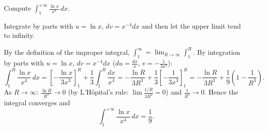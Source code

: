 
\begin{question}
Compute $\displaystyle\int_1^{+\infty}\frac{\ln x}{x^4}\,dx$.
\end{question}

\begin{hint}
Integrate by parts with $u=\ln x$, $dv=x^{-4}dx$ and then let the upper limit tend to infinity.
\end{hint}

\begin{solution}
By the definition of the improper integral, $\int_1^\infty=\lim_{R\to\infty}\int_1^R$. By integration by parts with $u=\ln x$, $dv=x^{-4}dx$ ($du=\frac{dx}{x}$, $v=-\frac{1}{3x^3}$):
\[ \int_1^R\frac{\ln x}{x^4}\,dx=\left[-\frac{\ln x}{3x^3}\right]_1^R+\frac13\int_1^R\frac{dx}{x^4}=-\frac{\ln R}{3R^3}+\frac13\left[-\frac{1}{3x^3}\right]_1^R=-\frac{\ln R}{3R^3}+\frac19\left(1-\frac{1}{R^3}\right). \]
As $R\to\infty$: $\frac{\ln R}{R^3}\to0$ (by L'Hôpital's rule: $\lim\frac{1/R}{3R^2}=0$) and $\frac1{R^3}\to0$. Hence the integral converges and
\[ \int_1^{+\infty}\frac{\ln x}{x^4}\,dx=\frac19. \]
\end{solution}
